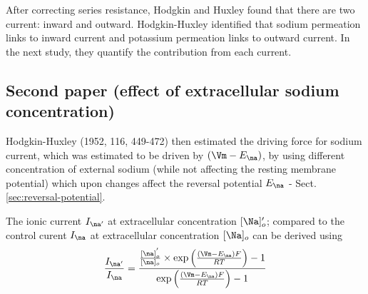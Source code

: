 After correcting series resistance, Hodgkin and Huxley found that there are two
current: inward and outward. Hodgkin-Huxley identified that sodium permeation
links to inward current and potassium permeation links to outward current.
In the next study, they quantify the contribution from each current.


\subsection{Second paper (effect of extracellular sodium concentration)}

Hodgkin-Huxley (1952, 116, 449-472) then estimated the driving force for sodium
current, which was estimated to be driven by $(\Vm-E_\na)$, by using different
concentration of external sodium (while not affecting the resting membrane
potential) which upon changes affect the reversal potential $E_\na$ -
Sect.\ref{sec:reversal-potential}.

The ionic current $I_{\na'}$ at extracellular concentration $[\Na]'_o$; compared
to the control curent $I_{\na}$ at extracellular concentration $[\Na]_o$ can be
derived using
\begin{equation}
\frac{I_{\na'}}{I_{\na}} = \frac{\frac{[\na]_o^{'}}{[\na]_o} \times 
\exp\left( \frac{(\Vm - E_\na)F}{RT} \right) -1 }{\exp\left(
\frac{(\Vm - E_\na)F}{RT} \right) -1}
\end{equation}


